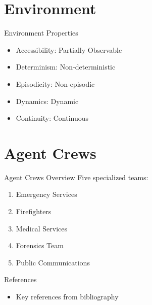 \documentclass{beamer}
\begin{document}
\section{Environment}
\begin{frame}{Environment Properties}
    \begin{itemize}
        \item Accessibility: Partially Observable
        \item Determinism: Non-deterministic
        \item Episodicity: Non-episodic
        \item Dynamics: Dynamic
        \item Continuity: Continuous
    \end{itemize}
\end{frame}

\section{Agent Crews}
\begin{frame}{Agent Crews Overview}
    Five specialized teams:
    \begin{enumerate}
        \item Emergency Services
        \item Firefighters
        \item Medical Services
        \item Forensics Team
        \item Public Communications
    \end{enumerate}
\end{frame}







\begin{frame}{References}
    \begin{itemize}
        \item Key references from bibliography
    \end{itemize}
\end{frame}
\end{document}
